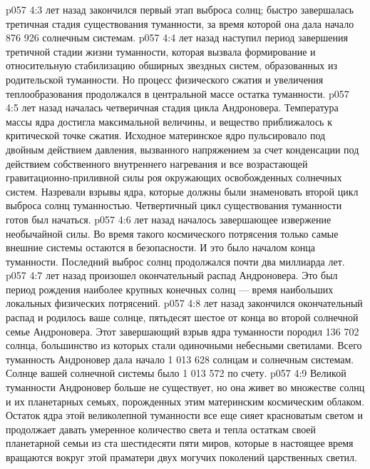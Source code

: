 \vs p057 4:3 \pc {} лет назад закончился первый этап выброса солнц; быстро завершалась третичная стадия существования туманности, за время которой она дала начало 876 926 солнечным системам.
\vs p057 4:4 \pc {} лет назад наступил период завершения третичной стадии жизни туманности, которая вызвала формирование и относительную стабилизацию обширных звездных систем, образованных из родительской туманности. Но процесс физического сжатия и увеличения теплообразования продолжался в центральной массе остатка туманности.
\vs p057 4:5 \pc {} лет назад началась четверичная стадия цикла Андроновера. Температура массы ядра достигла максимальной величины, и вещество приближалось к критической точке сжатия. Исходное материнское ядро пульсировало под двойным действием давления, вызванного напряжением за счет конденсации под действием собственного внутреннего нагревания и все возрастающей гравитационно\hyp{}приливной силы роя окружающих освобожденных солнечных систем. Назревали взрывы ядра, которые должны были знаменовать второй цикл выброса солнц туманностью. Четвертичный цикл существования туманности готов был начаться.
\vs p057 4:6 \pc {} лет назад началось завершающее извержение необычайной силы. Во время такого космического потрясения только самые внешние системы остаются в безопасности. И это было началом конца туманности. Последний выброс солнц продолжался почти два миллиарда лет.
\vs p057 4:7 \pc {} лет назад произошел окончательный распад Андроновера. Это был период рождения наиболее крупных конечных солнц --- время наибольших локальных физических потрясений.
\vs p057 4:8 \pc {} лет назад закончился окончательный распад и родилось ваше солнце, пятьдесят шестое от конца во второй солнечной семье Андроновера. Этот завершающий взрыв ядра туманности породил 136 702 солнца, большинство из которых стали одиночными небесными светилами. Всего туманность Андроновер дала начало 1 013 628 солнцам и солнечным системам. Солнце вашей солнечной системы было 1 013 572 по счету.
\vs p057 4:9 Великой туманности Андроновер больше не существует, но она живет во множестве солнц и их планетарных семьях, порожденных этим материнским космическим облаком. Остаток ядра этой великолепной туманности все еще сияет красноватым светом и продолжает давать умеренное количество света и тепла остаткам своей планетарной семьи из ста шестидесяти пяти миров, которые в настоящее время вращаются вокруг этой праматери двух могучих поколений царственных светил.
